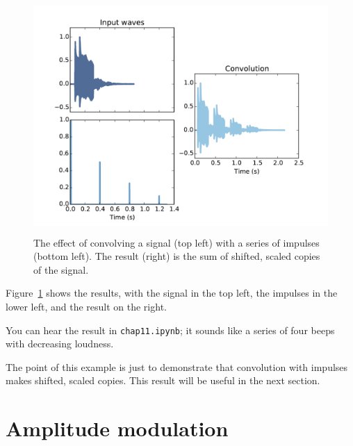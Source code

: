 \documentclass[12pt]{book}
\begin{document}
\begin{figure}
\centerline{\includegraphics[height=3.5in]{figs/sampling1.pdf}}
\caption{The effect of convolving a signal (top left) with a series of
  impulses (bottom left).  The result (right) is the sum of shifted,
  scaled copies of the signal.}
\label{fig.sampling1}
\end{figure}

Figure~\ref{fig.sampling1} shows the results, with the signal in
the top left, the impulses in the lower left, and the result on
the right.

You can hear the result in {\tt chap11.ipynb}; it sounds like
a series of four beeps with decreasing loudness.

The point of this example is just to demonstrate that convolution
with impulses makes shifted, scaled copies.  This result will be
useful in the next section.


\section{Amplitude modulation}
\label{am}
\end{document}
